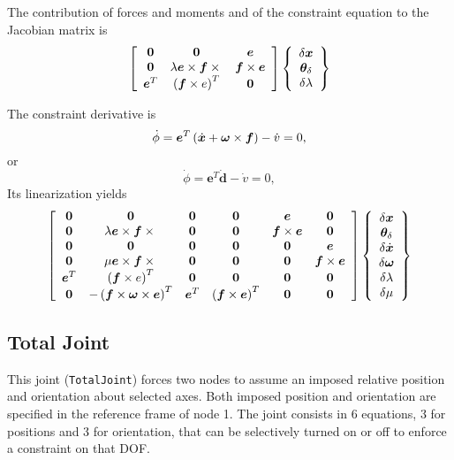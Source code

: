 \documentclass[10pt,fleqn,subeqn]{report}
\newcommand{\T}[1]{\bm{#1}}
\newcommand{\dof}{DOF}
\begin{document}
The contribution of forces and moments and of the constraint equation 
to the Jacobian matrix is
\begin{equation}
	\sqbr{\matr{ccc}{
		\T{0} & \T{0} & \T{e} \\
		\T{0} & \lambda \T{e}\times\T{f}\times{} & \T{f}\times\T{e} \\
		\T{e}^T & \plbr{\T{f}\times{e}}^T & \T{0}
	}}\cubr{\cvvect{
		\delta\T{x} \\
		\T{\theta}_{\delta} \\
		\delta\lambda
	}}
\end{equation}

The constraint derivative is
\begin{equation}
	\dot{\phi} = \T{e}^T \plbr{\dot{\T{x}} + \T{\omega}\times\T{f}} - \dot{v} = 0 ,
\end{equation}
or
\begin{equation}
	\dot{\phi} = \T{e}^T \dot{\T{d}} - \dot{v} = 0 ,
\end{equation}
Its linearization yields
\begin{equation}
	\sqbr{\matr{cccccc}{
		\T{0} & \T{0} & \T{0} & \T{0} & \T{e} & \T{0} \\
		\T{0} & \lambda \T{e}\times\T{f}\times{} & 
			\T{0} & \T{0} & \T{f}\times\T{e} & \T{0} \\
		\T{0} & \T{0} & \T{0} & \T{0} & \T{0} & \T{e} \\
		\T{0} & \mu \T{e}\times\T{f}\times{} & 
			\T{0} & \T{0} & \T{0} & \T{f}\times\T{e} \\
		\T{e}^T & \plbr{\T{f}\times{e}}^T & 
			\T{0} & \T{0} & \T{0} & \T{0} \\
		\T{0} & - \plbr{\T{f}\times\T{\omega}\times\T{e}}^T &
			\T{e}^T & \plbr{\T{f}\times\T{e}}^T & \T{0} & \T{0}
	}}\cubr{\cvvect{
		\delta\T{x} \\
		\T{\theta}_{\delta} \\
		\delta\dot{\T{x}} \\
		\delta\T{\omega} \\
		\delta\lambda \\
		\delta\mu
	}}
\end{equation}













\subsection{Total Joint}
\label{sec:TotalJoint}
This joint (\texttt{TotalJoint}) forces two nodes to assume an imposed relative
position and orientation about selected axes.
Both imposed position and orientation are specified in the reference frame
of node 1.
The joint consists in 6 equations, 3 for positions and 3 for orientation, 
that can be selectively turned on or off to enforce a constraint on that \dof.
\end{document}
